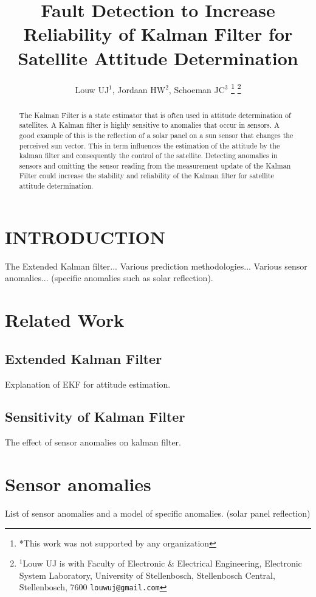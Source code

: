 \documentclass[letterpaper, 10 pt, conference]{ieeeconf}  %
\title{\LARGE \bf
Fault Detection to Increase Reliability of Kalman Filter for Satellite Attitude Determination
}
\author{Louw UJ$^{1}$, Jordaan HW$^{2}$, Schoeman JC$^{3}$%
\thanks{*This work was not supported by any organization}%
\thanks{$^{1}$Louw UJ is with Faculty of Electronic \& Electrical Engineering, Electronic System            Laboratory, University of Stellenbosch, Stellenbosch Central, Stellenbosch, 7600
        {\tt\small louwuj@gmail.com}}%
}
\begin{document}
\maketitle
\thispagestyle{empty}
\pagestyle{empty}


\begin{abstract}

The Kalman Filter is a state estimator that is often used in attitude determination of satellites. A Kalman filter is highly sensitive to anomalies that occur in sensors. A good example of this is the reflection of a solar panel on a sun sensor that changes the perceived sun vector. This in term influences the estimation of the attitude by the kalman filter and consequently the control of the satellite. Detecting anomalies in sensors and omitting the sensor reading from the measurement update of the Kalman Filter could increase the stability and reliability of the Kalman filter for satellite attitude determination.

\end{abstract}


\section{INTRODUCTION}
The Extended Kalman filter... Various prediction methodologies... Various sensor anomalies... (specific anomalies such as solar reflection).

\section{Related Work}


\subsection{Extended Kalman Filter}
Explanation of EKF for attitude estimation.

\subsection{Sensitivity of Kalman Filter}
The effect of sensor anomalies on kalman filter.

\section{Sensor anomalies}
List of sensor anomalies and a model of specific anomalies. (solar panel reflection)
\end{document}
